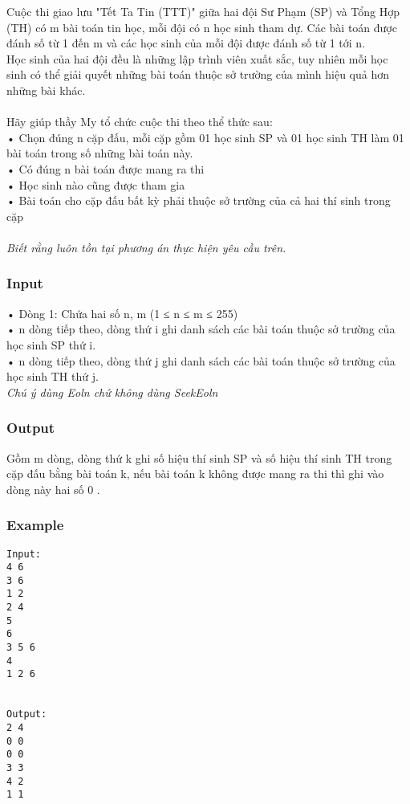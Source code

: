 



   Cuộc thi giao lưu "Tết Ta Tin (TTT)" giữa hai đội Sư Phạm (SP) và Tổng Hợp (TH) có m bài toán tin học, mỗi đội có n học sinh tham dự. Các bài toán được đánh số từ 1 đến m và các học sinh của mỗi đội được đánh số từ 1 tới n.   
\\   Học sinh của hai đội đều là những lập trình viên xuất sắc, tuy nhiên mỗi học sinh có thể giải quyết những bài toán thuộc sở trường của mình hiệu quả hơn những bài khác.   
\\
\\   Hãy giúp thầy My tổ chức cuộc thi theo thể thức sau:   
\\   • Chọn đúng n cặp đấu, mỗi cặp gồm 01 học sinh SP và 01 học sinh TH làm 01 bài toán trong số những bài toán này.   
\\   • Có đúng n bài toán được mang ra thi   
\\   • Học sinh nào cũng được tham gia   
\\   • Bài toán cho cặp đấu bất kỳ phải thuộc sở trường của cả hai thí sinh trong cặp   
\\
\\\textit{    Biết rằng luôn tồn tại phương án thực hiện yêu cầu trên.   }

\subsubsection{   Input  }

   • Dòng 1: Chứa hai số n, m (1 ≤ n ≤ m ≤ 255)   
\\   • n dòng tiếp theo, dòng thứ i ghi danh sách các bài toán thuộc sở trường của học sinh SP thứ i.   
\\   • n dòng tiếp theo, dòng thứ j ghi danh sách các bài toán thuộc sở trường của học sinh TH thứ j.   
\\\textit{    Chú ý dùng         Eoln        chứ không dùng         SeekEoln       }
\\

\subsubsection{   Output  }

   Gồm m dòng, dòng thứ k ghi số hiệu thí sinh SP và số hiệu thí sinh TH trong cặp đấu bằng bài toán k, nếu bài toán k không được mang ra thi thì ghi vào dòng này hai số 0 .  

\subsubsection{   Example  }
\begin{verbatim}
Input:
4 6
3 6
1 2
2 4
5
6
3 5 6
4
1 2 6


Output:
2 4
0 0
0 0
3 3
4 2
1 1

\end{verbatim}